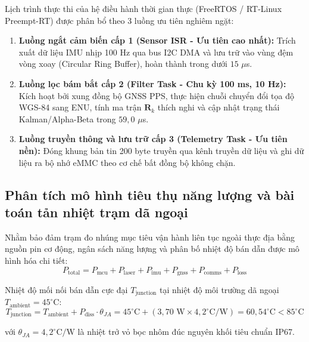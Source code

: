 Lịch trình thực thi của hệ điều hành thời gian thực (FreeRTOS / RT-Linux Preempt-RT) được phân bổ theo 3 luồng ưu tiên nghiêm ngặt:
\begin{enumerate}
    \item \textbf{Luồng ngắt cảm biến cấp 1 (Sensor ISR - Ưu tiên cao nhất):} Trích xuất dữ liệu IMU nhịp 100 Hz qua bus I2C DMA và lưu trữ vào vùng đệm vòng xoay (Circular Ring Buffer), hoàn thành trong dưới $15$ $\mu$s.
    \item \textbf{Luồng lọc bám bắt cấp 2 (Filter Task - Chu kỳ 100 ms, 10 Hz):} Kích hoạt bởi xung đồng bộ GNSS PPS, thực hiện chuỗi chuyển đổi tọa độ WGS-84 sang ENU, tính ma trận $\mathbf{R}_k$ thích nghi và cập nhật trạng thái Kalman/Alpha-Beta trong $59{,}0$ $\mu$s.
    \item \textbf{Luồng truyền thông và lưu trữ cấp 3 (Telemetry Task - Ưu tiên nền):} Đóng khung bản tin 200 byte truyền qua kênh truyền dữ liệu và ghi dữ liệu ra bộ nhớ eMMC theo cơ chế bất đồng bộ không chặn.
\end{enumerate}

\subsection{Phân tích mô hình tiêu thụ năng lượng và bài toán tản nhiệt trạm dã ngoại}

\hspace{0.5cm} Nhằm bảo đảm trạm đo nhúng mục tiêu vận hành liên tục ngoài thực địa bằng nguồn pin cơ động, ngân sách năng lượng và phân bố nhiệt độ bán dẫn được mô hình hóa chi tiết:
\begin{equation}
P_{\text{total}} = P_{\text{mcu}} + P_{\text{laser}} + P_{\text{imu}} + P_{\text{gnss}} + P_{\text{comms}} + P_{\text{loss}}
\label{eq:total-power-budget-formula}
\end{equation}

Nhiệt độ mối nối bán dẫn cực đại $T_{\text{junction}}$ tại nhiệt độ môi trường dã ngoại $T_{\text{ambient}} = 45^\circ\text{C}$:
\begin{equation}
T_{\text{junction}} = T_{\text{ambient}} + P_{\text{diss}} \cdot \theta_{JA} = 45^\circ\text{C} + (3{,}70\text{ W} \times 4{,}2^\circ\text{C/W}) = 60{,}54^\circ\text{C} < 85^\circ\text{C}
\label{eq:thermal-junction-formula}
\end{equation}

với $\theta_{JA} = 4{,}2^\circ\text{C/W}$ là nhiệt trở vỏ bọc nhôm đúc nguyên khối tiêu chuẩn IP67.


